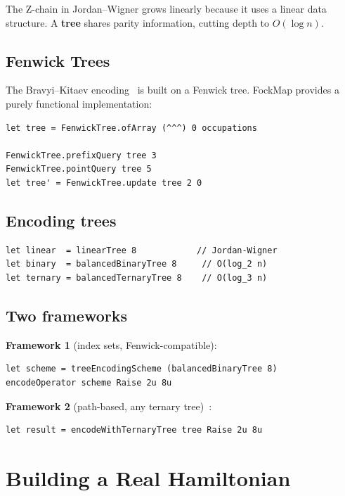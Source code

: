 \documentclass[10pt,a4paper]{article}
\begin{document}
The Z-chain in Jordan--Wigner grows linearly because it uses a linear
data structure.  A \textbf{tree} shares parity information, cutting
depth to $O(\log n)$.

\subsection{Fenwick Trees}

The Bravyi--Kitaev encoding~\cite{bravyi2002,seeley2012} is built
on a Fenwick tree.  FockMap provides a purely functional implementation:

\begin{lstlisting}
let tree = FenwickTree.ofArray (^^^) 0 occupations

FenwickTree.prefixQuery tree 3
FenwickTree.pointQuery tree 5
let tree' = FenwickTree.update tree 2 0
\end{lstlisting}

\subsection{Encoding trees}

\begin{lstlisting}
let linear  = linearTree 8            // Jordan-Wigner
let binary  = balancedBinaryTree 8     // O(log_2 n)
let ternary = balancedTernaryTree 8    // O(log_3 n)
\end{lstlisting}

\subsection{Two frameworks}

\textbf{Framework 1} (index sets, Fenwick-compatible):
\begin{lstlisting}
let scheme = treeEncodingScheme (balancedBinaryTree 8)
encodeOperator scheme Raise 2u 8u
\end{lstlisting}

\textbf{Framework 2} (path-based, any ternary
tree)~\cite{jiang2020}:
\begin{lstlisting}
let result = encodeWithTernaryTree tree Raise 2u 8u
\end{lstlisting}


\section{Building a Real Hamiltonian}\label{ch:hamiltonian}
\end{document}
